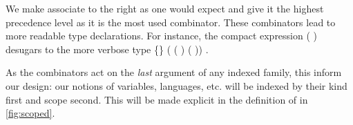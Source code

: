 
\begin{minipage}[t]{0.6\textwidth}
\end{minipage}
\begin{minipage}[t]{0.4\textwidth}
\end{minipage}

We make  associate to the right as one would expect and give it the
highest precedence level as it is the most used combinator. These combinators
lead to more readable type declarations.  For instance, the compact expression
\AF{∀[}   (  )   \AF{]}
desugars to the more verbose type
 \{\}  ( ( )   ( ))   .

As the combinators act on the \emph{last} argument of any indexed family, this inform our
design: our notions of variables, languages, etc. will be indexed by their kind first and
scope second. This will be made explicit in the definition of  in
\cref{fig:scoped}.
